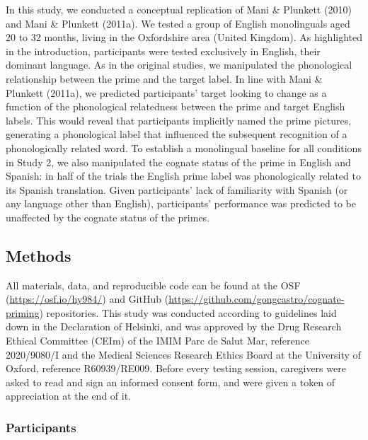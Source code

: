 \documentclass[
  12pt,
  b5paperpaper,
  twoside]{scrreprt}
\begin{document}
In this study, we conducted a conceptual replication of Mani \& Plunkett
(2010) and Mani \& Plunkett (2011a). We tested a group of English
monolinguals aged 20 to 32 months, living in the Oxfordshire area
(United Kingdom). As highlighted in the introduction, participants were
tested exclusively in English, their dominant language. As in the
original studies, we manipulated the phonological relationship between
the prime and the target label. In line with Mani \& Plunkett (2011a),
we predicted participants' target looking to change as a function of the
phonological relatedness between the prime and target English labels.
This would reveal that participants implicitly named the prime pictures,
generating a phonological label that influenced the subsequent
recognition of a phonologically related word. To establish a monolingual
baseline for all conditions in Study 2, we also manipulated the cognate
status of the prime in English and Spanish: in half of the trials the
English prime label was phonologically related to its Spanish
translation. Given participants' lack of familiarity with Spanish (or
any language other than English), participants' performance was
predicted to be unaffected by the cognate status of the primes.

\hypertarget{methods}{%
\subsection{Methods}\label{methods}}

All materials, data, and reproducible code can be found at the OSF
(\href{https://osf.io/ckydb/}{https://osf.io/hy984/}) and GitHub
(\url{https://github.com/gongcastro/cognate-priming}) repositories. This
study was conducted according to guidelines laid down in the Declaration
of Helsinki, and was approved by the Drug Research Ethical Committee
(CEIm) of the IMIM Parc de Salut Mar, reference 2020/9080/I and the
Medical Sciences Research Ethics Board at the University of Oxford,
reference R60939/RE009. Before every testing session, caregivers were
asked to read and sign an informed consent form, and were given a token
of appreciation at the end of it.

\hypertarget{participants}{%
\subsubsection{Participants}\label{participants}}
\end{document}
